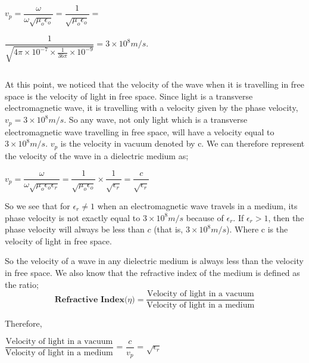 $v_p=\dfrac{\omega}{\omega\sqrt{\mu_{o}\epsilon_{o}}}=\dfrac{1}{\sqrt{\mu_{o}\epsilon_{o}}}=$ 

$\dfrac{1}{\sqrt{4\pi\times 10^{-7}\times \frac{1}{36\pi}\times 10^{-9}}}=3\times 10^{8}m/s.$

\begin{equation}\end{equation}

At this point, we noticed that the velocity of the wave when it is travelling in free space is the velocity of light in free space. Since light is a transverse electromagnetic wave, it is travelling with a velocity given by the phase velocity, $v_{p} = 3\times 10^{8}m/s$. So any wave, not only light which is a transverse electromagnetic wave travelling in free space, will have a velocity equal to $3\times 10^{8}m/s$. $v_p$ is the velocity in vacuum denoted by c.
We can therefore represent the velocity of the wave in a dielectric medium as;

$v_p=\dfrac{\omega}{\omega\sqrt{\mu_{o}\epsilon_{o}\epsilon_{r}}}=\dfrac{1}{\sqrt{\mu_{o}\epsilon_{o}}}\times \dfrac{1}{\sqrt{\epsilon_{r}}}=\dfrac{c}{\sqrt{\epsilon_{r}}}$
\begin{equation}\end{equation}

So we see that for $\epsilon_{r}\neq 1$ when an electromagnetic wave travels in a medium, its phase velocity is not exactly equal to  $3\times 10^{8}m/s$ because of $\epsilon_{r}$. If $\epsilon_{r}>1$, then the phase velocity will always be less than $c$ (that is, $3\times 10^{8}m/s$). Where c is the velocity of light in free space.

So the velocity of a wave in any dielectric medium is always less than the velocity in free space. We also know that the refractive index of the medium is defined as the ratio;
\begin{equation}
\textbf{Refractive Index($\eta$)} =	\dfrac{\text{Velocity of light in a vacuum}}{\text{Velocity of light in a medium}}
\end{equation}
\begin{equation}\end{equation}

Therefore,
\begin{center}
$\dfrac{\text{Velocity of light in a vacuum}}{\text{Velocity of light in a medium}}$	
= $\dfrac{c}{v_{p}}$ = $\sqrt{\epsilon_{r}}$  
\end{center}
\begin{equation}\end{equation}

